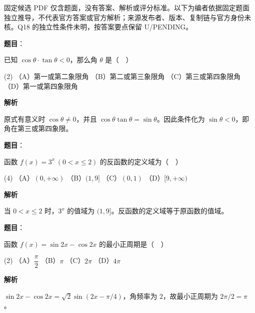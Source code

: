 

\begin{gktip}
固定候选 PDF 仅含题面，没有答案、解析或评分标准。以下为编者依据固定题面独立推导，不代表官方答案或官方解析；来源发布者、版本、复制链与官方身份未核。Q18 的独立性条件未明，按答案要点保留 U/PENDING。
\end{gktip}


\begin{answer}

\textbf{题目}：

已知 $\cos\theta\cdot\tan\theta<0$，那么角 $\theta$ 是（　）

\begin{gkopts}(2)
\task （A）第一或第二象限角
\task （B）第二或第三象限角
\task （C）第三或第四象限角
\task （D）第一或第四象限角
\end{gkopts}

\textbf{解析}

原式有意义时 $\cos\theta\ne0$，并且 $\cos\theta\tan\theta=\sin\theta$。因此条件化为 $\sin\theta<0$，即角在第三或第四象限。


\end{answer}
\begin{answer}

\textbf{题目}：

函数 $f(x)=3^x\ (0<x\leq 2)$ 的反函数的定义域为（　）

\begin{gkopts}(4)
\task （A）$(0,+\infty)$
\task （B）$(1,9]$
\task （C）$(0,1)$
\task （D）$[9,+\infty)$
\end{gkopts}

\textbf{解析}

当 $0<x\leq2$ 时，$3^x$ 的值域为 $(1,9]$。反函数的定义域等于原函数的值域。

\gkanswer{答案：B，$(1,9]$}

\end{answer}
\begin{answer}

\textbf{题目}：

函数 $f(x)=\sin 2x-\cos 2x$ 的最小正周期是（　）

\begin{gkopts}(2)
\task （A）$\dfrac{\pi}{2}$
\task （B）$\pi$
\task （C）$2\pi$
\task （D）$4\pi$
\end{gkopts}

\textbf{解析}

$\sin2x-\cos2x=\sqrt2\sin(2x-\pi/4)$，角频率为 $2$，故最小正周期为 $2\pi/2=\pi$。


\end{answer}
